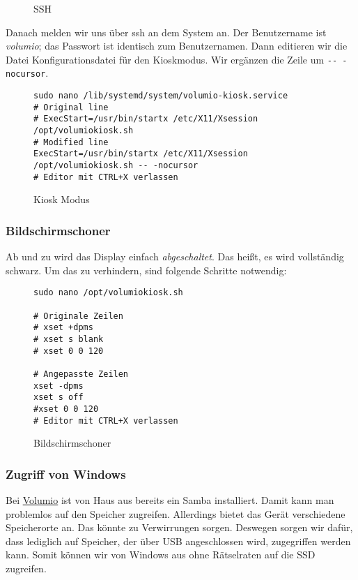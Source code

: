 \documentclass[12pt,a4paper]{article}
\newcommand{\code}[1]{\texttt{#1}}
\newcommand{\jpaimg}[2]{\begin{figure}[H]\centering\fbox{\texttt{[image: \#1]}}\caption{#2}\label{fig:#2}\end{figure}}
\newcommand{\vol}{\href{https://volumio.org/}{Volumio}\index{Volumio}}
\begin{document}
\jpaimg{./../images/vol-dev.png}{SSH}

Danach melden wir uns über ssh an dem System an. Der Benutzername ist \textit{volumio}; das Passwort ist identisch zum Benutzernamen. Dann editieren wir die
Datei Konfigurationsdatei für den Kioskmodus. Wir ergänzen die Zeile um \code{-{}- -nocursor}.

\begin{figure}[H]
\begin{lstlisting}
sudo nano /lib/systemd/system/volumio-kiosk.service
# Original line
# ExecStart=/usr/bin/startx /etc/X11/Xsession /opt/volumiokiosk.sh
# Modified line
ExecStart=/usr/bin/startx /etc/X11/Xsession /opt/volumiokiosk.sh -- -nocursor
# Editor mit CTRL+X verlassen
\end{lstlisting}
\caption{Kiosk Modus}\label{fig:Kiosk Modus}
\end{figure}

\subsubsection{Bildschirmschoner}
Ab und zu wird das Display einfach \textit{abgeschaltet}. Das heißt, es wird vollständig schwarz. Um das zu verhindern, sind folgende Schritte notwendig:

\begin{figure}[H]
\begin{lstlisting}
sudo nano /opt/volumiokiosk.sh

# Originale Zeilen
# xset +dpms
# xset s blank
# xset 0 0 120

# Angepasste Zeilen
xset -dpms
xset s off
#xset 0 0 120
# Editor mit CTRL+X verlassen
\end{lstlisting}
\caption{Bildschirmschoner}\label{fig:Bildschirmschoner}
\end{figure}

\subsubsection{Zugriff von Windows}
Bei \vol{} ist von Haus aus bereits ein Samba installiert. Damit kann man problemlos auf den Speicher zugreifen. Allerdings bietet das Gerät verschiedene
Speicherorte an. Das könnte zu Verwirrungen sorgen. Deswegen sorgen wir dafür, dass lediglich auf Speicher, der über USB angeschlossen wird, zugegriffen werden
kann. Somit können wir von Windows aus ohne Rätselraten auf die SSD zugreifen.
\end{document}

